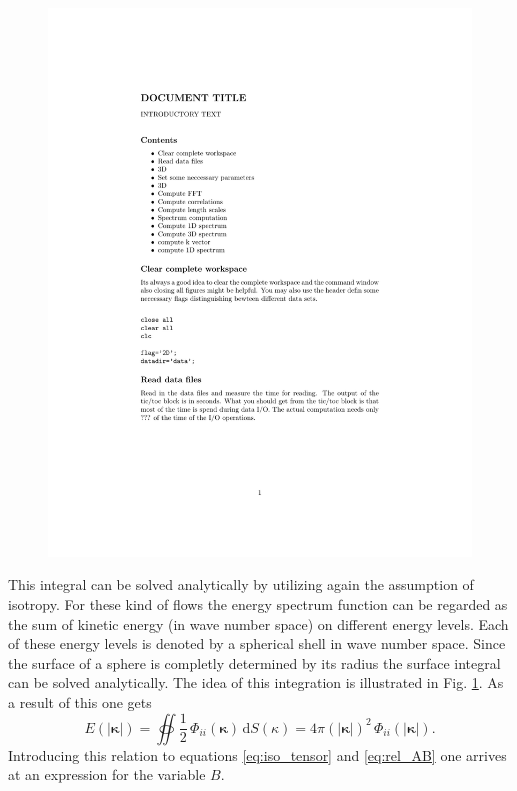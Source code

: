 \documentclass[preprint,12pt,ntfdMod]{elsarticle}
\begin{document}
\begin{par}
\begin{figure}[t!]
{      \includegraphics[scale=0.4]{spectrum}
      \label{fig:shell_int}
      }
  \end{figure}
This integral can be solved analytically by utilizing again the assumption of isotropy.
For these kind of flows the energy spectrum function can be regarded as the sum of kinetic energy
(in wave number space) on different energy levels. Each of these energy levels is denoted by a spherical
shell in wave number space. Since the surface of a sphere is completly determined by its radius the
surface integral can be solved analytically. The idea of this integration is illustrated
in Fig. \ref{fig:shell_int}.
As a result of this one gets
  \begin{equation}
      E(|\boldsymbol\kappa|)=\oiint\frac{1}{2}\,\Phi_{ii}(\boldsymbol\kappa)\,\mathrm{d}S(\kappa)
      =4\pi(|\boldsymbol\kappa|)^2\,\Phi_{ii}(|\boldsymbol\kappa|).
  \end{equation}
Introducing this relation to equations \eqref{eq:iso_tensor} and
\eqref{eq:rel_AB} one arrives at an expression for the variable $B$.

\end{par}
\end{document}
